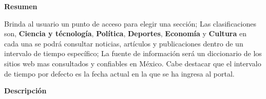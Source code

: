 
\begin{large}
	\textbf{Resumen}\\
\end{large}

Brinda al usuario un punto de acceso para elegir una sección; Las clasificaciones son, \textbf{Ciencia y técnología}, \textbf{Política}, \textbf{Deportes}, \textbf{Economía} y  \textbf{Cultura} en cada una se podrá consultar noticias, artículos y publicaciones dentro de un intervalo de tiempo específico; La fuente de información será un diccionario de los sitios web mas consultados y confiables en México. Cabe destacar que el intervalo de tiempo por defecto es la fecha actual en la que se ha ingresa al portal.\\

\begin{large}
	\textbf{Descripción}\\
\end{large}


